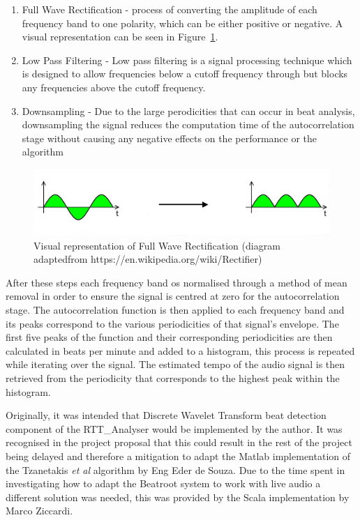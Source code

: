 \documentclass[a4paper, 11pt]{article}
\begin{document}
\begin{enumerate}
\item Full Wave Rectification - process of converting the amplitude of each frequency band to one polarity\cite{pallas}, which can be either positive or negative. A visual representation can be seen in Figure~\ref{fig: fwr}.
\item Low Pass Filtering - Low pass filtering is a signal processing technique which is designed to allow frequencies below a cutoff frequency through but blocks any frequencies above the cutoff frequency\cite{smith}.
\item Downsampling - Due to the large perodicities that can occur in beat analysis, downsampling the signal reduces the computation time of the autocorrelation stage without causing any negative effects on the performance or the algorithm\cite{tzane3}
\end{enumerate}

\begin{figure}[ht]
	\centering
	\includegraphics[scale=0.25]{FWR2}
	\caption{Visual representation of Full Wave Rectification (diagram adaptedfrom https://en.wikipedia.org/wiki/Rectifier)}
	\label{fig: fwr}
\end{figure}


After these steps each frequency band os normalised through a method of mean removal in order to ensure the signal is centred at zero for the autocorrelation stage. The autocorrelation function is then applied to each frequency band and its peaks correspond to the various periodicities of that signal's envelope. The first five peaks of the function and their corresponding periodicities are then calculated in beats per minute and added to a histogram, this process is repeated while iterating over the signal. The estimated tempo of the audio signal is then retrieved from the periodicity that corresponds to the highest peak within the histogram\cite{tzane1}.

Originally, it was intended that Discrete Wavelet Transform beat detection component of the RTT\_Analyser would be implemented by the author. It was recognised in the project proposal that this could result in the rest of the project being delayed and therefore a mitigation to adapt the Matlab implementation of the Tzanetakis \textit{et al}\cite{tzane1} algorithm by Eng Eder de Souza\cite{desouze}. Due to the time spent in investigating how to adapt the Beatroot system to work with live audio a different solution was needed, this was provided by the Scala implementation by Marco Ziccardi\cite{marcoZin}.
\end{document}
